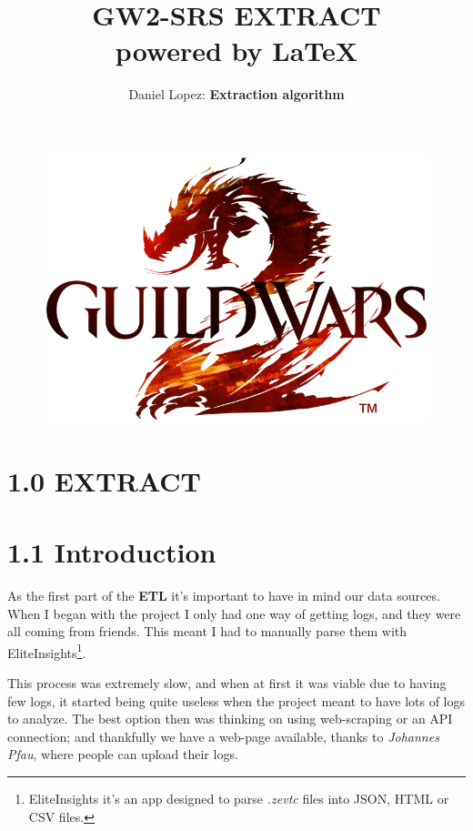 \documentclass[12pt,a4paper]{article}
\title{%
    \vspace*{-5mm}\Huge GW2-SRS EXTRACT \\
    \vspace*{2mm}\Large powered by \LaTeX}
\author{\vspace*{-5mm}\large Daniel Lopez: \textbf{Extraction algorithm}}
\begin{document}
    \maketitle

    \begin{figure}[H]
        \centering
        \includegraphics[width=1 \textwidth]{Images/Nuevo_logo_GW2.png}
    \end{figure}

    \newpage

    \section*{1.0 EXTRACT}

    \section*{\large 1.1 Introduction}
    As the first part of the \textbf{ETL} it's important to have in mind our data sources. When
    I began with the project I only had one way of getting logs, and they were all coming
    from friends. This meant I had to manually parse them with EliteInsights\footnote{EliteInsights it's an app designed to parse \textit{.zevtc} files into JSON, HTML or CSV files.}. 

    This process was extremely slow, and when at first it was viable due to having few logs,
    it started being quite useless when the project meant to have lots of logs to analyze.
    The best option then was thinking on using web-scraping or an API connection; and thankfully
    we have a web-page available, thanks to \textit{Johannes Pfau}, where people can upload their logs.\\
\end{document}
